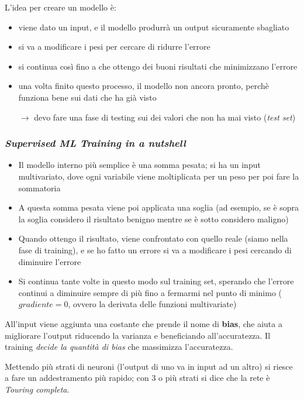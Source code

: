 \documentclass{report}
\begin{document}
\noindent L'idea per creare un modello è:
\begin{itemize}
    \item viene dato un input, e il modello produrrà un output sicuramente sbagliato 
    \item si va a modificare i pesi per cercare di ridurre l'errore 
    \item si continua così fino a che ottengo dei buoni risultati che minimizzano l'errore 
    \item una volta finito questo processo, il modello non ancora pronto, perchè funziona bene sui dati che ha già visto 
    
    $\rightarrow$ devo fare una fase di testing sui dei valori che non ha mai visto (\textit{test set})
\end{itemize}

\subsubsection{\textit{Supervised ML Training in a nutshell}}
\begin{itemize}
    \item Il modello interno più semplice è una somma pesata; si ha un input multivariato, dove ogni variabile viene moltiplicata per un peso per poi
    fare la sommatoria
    \item A questa somma pesata viene poi applicata una soglia (ad esempio, se è sopra la soglia considero il risultato benigno mentre se è sotto 
    considero maligno)
    \item Quando ottengo il risultato, viene confrontato con quello reale (siamo nella fase di training), e se ho fatto un errore si va 
    a modificare i pesi cercando di diminuire l'errore
    \item Si continua tante volte in questo modo sul training set, sperando che l'errore continui a diminuire sempre di più fino a fermarmi 
    nel punto di minimo ($gradiente = 0$, ovvero la derivata delle funzioni multivariate)
\end{itemize}

\noindent All'input viene aggiunta una costante che prende il nome di \textbf{bias}, che aiuta a migliorare l'output riducendo la varianza 
e beneficiando all'accuratezza. Il training \textit{decide la quantità di bias} che massimizza l'accuratezza.

\noindent Mettendo più strati di neuroni (l'output di uno va in input ad un altro) si riesce a fare un addestramento più rapido; con 3 o più strati 
si dice che la rete è \textit{Touring completa}.
\end{document}
